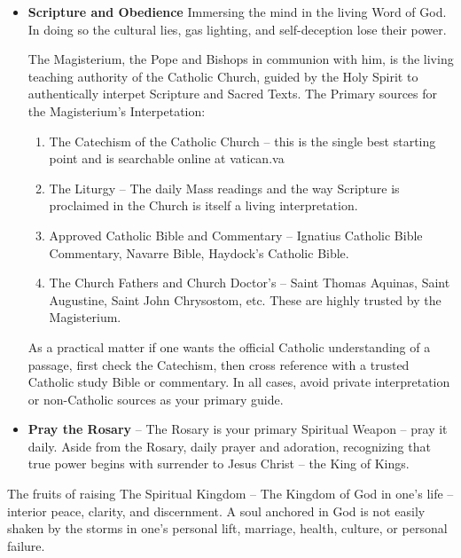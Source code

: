 \documentclass[12pt,a4paper]{book}
\begin{document}
\begin{itemize}
The Catholic Church has always understood "binding and loosing" to include the authority to forgive or retain sins in confession.

\item \textbf{Scripture and Obedience} Immersing the mind in the living Word of God.  In doing so the cultural lies, gas lighting, and self-deception lose their power. 

The Magisterium, the Pope and Bishops in communion with him, is the living teaching authority of the Catholic Church, guided by the Holy Spirit to authentically interpet Scripture and Sacred Texts.   The Primary sources for the Magisterium's Interpetation:

\begin{enumerate}
\item The Catechism of the Catholic Church -- this is the single best starting point and is searchable online at vatican.va
\item The Liturgy -- The daily Mass readings and the way Scripture is proclaimed in the Church is itself a living interpretation.
\item Approved Catholic Bible and Commentary -- Ignatius Catholic Bible Commentary, Navarre Bible, Haydock's Catholic Bible. 
\item The Church Fathers and Church Doctor's -- Saint Thomas Aquinas, Saint Augustine,  Saint John Chrysostom, etc.  These are highly trusted by the Magisterium.
\end{enumerate}

As a practical matter if one wants the official Catholic understanding of a passage, first check the Catechism, then cross reference with a trusted Catholic study Bible or commentary.  In all cases, avoid private interpretation or non-Catholic sources as your primary guide.

\item \textbf{Pray the Rosary} -- The Rosary is your primary Spiritual Weapon -- pray it daily.  Aside from the Rosary, daily prayer and adoration, recognizing that true power begins with surrender to Jesus Christ -- the King of Kings.

\end{itemize}

The fruits of raising The Spiritual Kingdom -- The Kingdom of God in one's life -- interior peace, clarity, and discernment.   A soul anchored in God is not easily shaken by the storms in one's personal lift, marriage, health, culture, or personal failure.
\end{document}
